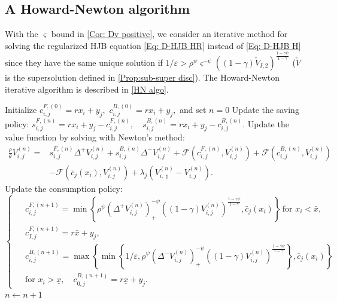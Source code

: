 \documentclass[11pt]{article}
\numberwithin{equation}{section}
\numberwithin{algorithm}{section}
\newcommand{\lc}{\left(}
\newcommand{\rc}{\right)}
\newcommand{\eps}{\varepsilon}
\newcommand{\ux}{{\underline x}}
\newcommand{\beq}{\begin{equation}}
\newcommand{\eeq}{\end{equation}}
\newcommand{\g}{\gamma}
\newcommand{\p}{\psi}
\theoremstyle{plain}
\newcommand{\D}{\Delta}
\begin{document}
\subsection{A Howard-Newton algorithm}
With the $\varsigma$ bound in \cref{Cor: Dv positive}, we consider an iterative method for solving the regularized HJB equation \cref{Eq: D-HJB HR} instead of \cref{Eq: D-HJB H} since they have the same unique solution if $1/{\eps}>\rho^{\p}\varsigma^{-\p}\lc(1-\g)\check{V}_{I,2}\rc^{\frac{1-\g \p}{1-\g}}$ ($\check{V}$ is the supersolution defined in \cref{Prop:sub-super disc}). The  Howard-Newton iterative algorithm is described in \cref{HN algo}.
\begin{algorithm}[!h]
\caption{Howard-Newton algorithm}
\label{HN algo}
\begin{algorithmic}[1]
\State Initialize 
$
c^{F,(0)}_{i,j}=rx_i+y_j,\,\,c^{B,(0)}_{i,j}=rx_i+y_j,
$
and set $n = 0$
\Repeat
\State Update the saving policy: 
$
s^{F,({n})}_{i,j}=rx_i+y_j-c^{F,({n})}_{i,j},\quad s^{B,({n})}_{i,j}=rx_i+y_j-c^{B,({n})}_{i,j}.
$ 
\State Update the value function by solving with Newton's method: 
\beq\label{Eq: Howard solve V}
\begin{aligned}
\frac{\rho}{\theta} V^{({n})}_{i,j}
={}& s^{F,({n})}_{i,j}\D^+{V^{({n})}_{i,j}}+s^{B,({n})}_{i,j}\D^-{V^{({n})}_{i,j}}+\mathcal{F}\lc c^{F,({n})}_{i,j},V^{({n})}_{i,j}\rc+\mathcal{F}\lc c^{B,({n})}_{i,j},V^{({n})}_{i,j}\rc\\
{}&-\mathcal{F}\lc \bar{c}_{j}(x_i),V^{({n})}_{i,j}\rc+\lambda_j\lc V^{({n})}_{i,\bar \jmath}-V^{({n})}_{i,j} \rc.
\end{aligned}
\eeq
\State Update the consumption policy: 
\beq\label{Eq: Howard-Newton P-update}
\left\{
\begin{aligned}
\,\,  &c^{F,({n}+1)}_{i,j}=\min\left\{\rho^{\p}\lc \D^+{V^{({n})}_{i,j}}\rc_+^{-\p}\lc(1-\g)V^{(n)}_{i,j}\rc^{\frac{1-\g \p}{1-\g}},\bar{c}_{j}(x_i)\right\}\,\text{for}\,\,x_i<\bar{x},\\
& c^{F,({n}+1)}_{I,j}=r\bar{x}+y_j,\\
&c^{B,({n}+1)}_{i,j}=\max\left\{\min\left\{1/\eps,\rho^{\p}\lc \D^-{V^{({n})}_{i,j}}\rc_+^{-\p}\lc(1-\g)V^{(n)}_{i,j}\rc^{\frac{1-\g \p}{1-\g}}\right\},\bar{c}_{j}(x_i)\right\}\\
 &\text{for}\,\,x_i>\ux,\quad c^{B,({n}+1)}_{0,j}=r\ux+y_j.
\end{aligned}
   \right.
\eeq
\State $n \gets n+ 1$
\end{algorithmic}
\end{algorithm}
\end{document}
